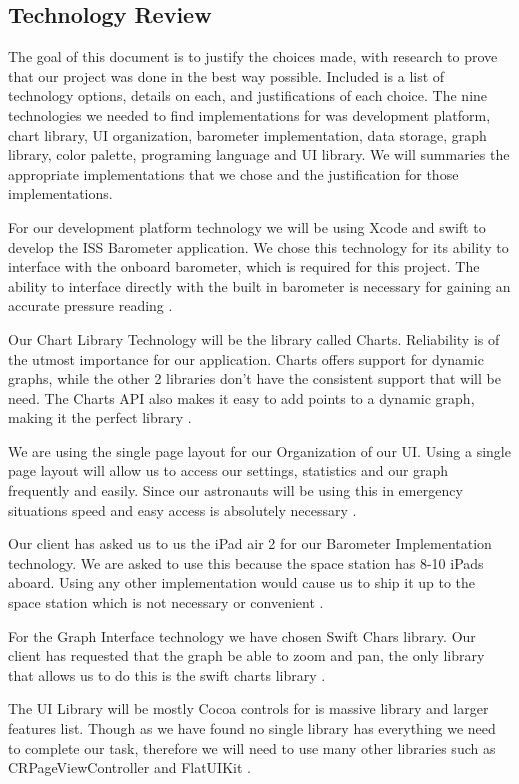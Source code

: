 \documentclass[onecolumn, draftclsnofoot,10pt, compsoc]{IEEEtran}
\begin{document}
\subsection{Technology Review}
The goal of this document is to justify the choices made, with research to prove that our project was done in the best way possible.
Included is a list of technology options, details on each, and justifications of each choice.
The nine technologies we needed to find implementations  for was development platform, chart library, UI organization, barometer implementation, data storage, graph library, color palette, programing language and UI library.
We will summaries the appropriate implementations that we chose and the justification for those implementations.

For our development platform technology we will be using Xcode and swift to develop the ISS Barometer application.
We chose this technology for its ability to interface with the onboard barometer, which is required for this project.
The ability to interface directly with the built in barometer is necessary for gaining an accurate pressure reading \cite{techDocKato}.


Our Chart Library Technology will be the library called Charts.
Reliability is of the utmost importance for our application.
Charts offers support for dynamic graphs, while the other 2 libraries don't have the consistent support that will be need.
The Charts API also makes it easy to add points to a dynamic graph, making it the perfect library \cite{techDocKato}.

We are using the single page layout for our Organization of our UI.
Using a single page layout will allow us to access our settings, statistics and our graph frequently and easily.
Since our astronauts will be using this in emergency situations speed and easy access is absolutely necessary \cite{techDocKato}.

Our client has asked us to us the iPad air 2 for our Barometer Implementation technology.
We are asked to use this because the space station has 8-10 iPads aboard.
Using any other implementation would cause us to ship it up to the space station which is not necessary or convenient \cite{techDocRaichart}.

For the Graph Interface technology we have chosen Swift Chars library.
Our client has requested that the graph be able to zoom and pan, the only library that allows us to do this is the swift charts library \cite{techDocRaichart}.

The UI Library will be mostly Cocoa controls for is massive library and larger features list.
Though as we have found no single library has everything we need to complete our task, therefore we will need to use many other libraries such as CRPageViewController and FlatUIKit \cite{techDocRaichart}.
\end{document}
